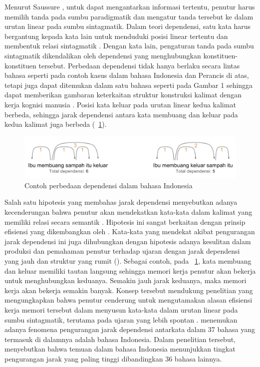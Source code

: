 Menurut Saussure \citep{key2017course}, untuk dapat mengantarkan informasi tertentu, penutur harus memilih tanda pada sumbu paradigmatik dan mengatur tanda tersebut ke dalam urutan linear pada sumbu sintagmatik. Dalam teori dependensi, satu kata harus bergantung kepada kata lain untuk menduduki posisi linear tertentu dan membentuk relasi sintagmatik \citep{tesniere1959elements}. Dengan kata lain, pengaturan tanda pada sumbu sintagmatik dikendalikan oleh dependensi yang menghubungkan konstituen-konstituen tersebut. Perbedaan dependensi tidak hanya berlaku secara lintas bahasa seperti pada contoh kasus dalam bahasa Indonesia dan Perancis di atas, tetapi juga dapat ditemukan dalam satu bahasa seperti pada Gambar 1 sehingga dapat memberikan gambaran keterkaitan struktur konstruksi kalimat dengan kerja kognisi manusia \citep{gibson2000dependency}. Posisi kata keluar pada urutan linear kedua kalimat berbeda, sehingga jarak dependensi antara kata membuang dan keluar pada kedua kalimat juga berbeda (\pic~\ref{fig:contoh-dependensi}). 
\begin{figure}
	\centering \includegraphics[width=1
	\textwidth] {pics/contoh-dependensi.png} \caption{Contoh perbedaan dependensi dalam bahasa Indonesia} 
\label{fig:contoh-dependensi} \end{figure}

Salah satu hipotesis yang membahas jarak dependensi menyebutkan adanya kecenderungan bahwa penutur akan mendekatkan kata-kata dalam kalimat yang memiliki relasi secara semantik \citep{futrell2015large}. Hipotesis ini sangat berkaitan dengan prinsip efisiensi yang dikembangkan oleh \cite{hawkins2004efficiency}. Kata-kata yang mendekat akibat pengurangan jarak dependensi ini juga dihubungkan dengan hipotesis adanya kesulitan dalam produksi dan pemahaman penutur terhadap ujaran dengan jarak dependensi yang jauh dan struktur yang rumit (\citealp{hawkins2004efficiency, dillon2011structured}). Sebagai contoh, pada \pic~\ref{fig:contoh-dependensi}, kata membuang dan keluar memiliki tautan langsung sehingga memori kerja penutur akan bekerja untuk menghubungkan keduanya. Semakin jauh jarak keduanya, maka memori kerja akan bekerja semakin banyak. Konsep tersebut mendukung penelitian \cite{jaeger2006redundancy} yang mengungkapkan bahwa penutur cenderung untuk mengutamakan alasan efisiensi kerja memori tersebut dalam menyusun kata-kata dalam urutan linear pada sumbu sintagmatik, terutama pada ujaran yang lebih spontan \citep{jaeger2006redundancy}. \cite{futrell2015large} menemukan adanya fenomena pengurangan jarak dependensi antarkata dalam 37 bahasa yang termasuk di dalamnya adalah bahasa Indonesia. Dalam penelitian tersebut, \cite{futrell2015large} menyebutkan bahwa temuan dalam bahasa Indonesia menunjukkan tingkat pengurangan jarak yang paling tinggi dibandingkan 36 bahasa lainnya. 

